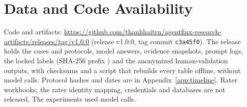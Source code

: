 \documentclass[10pt,letterpaper]{article}
\begin{document}
\section*{Data and Code Availability}
Code and artifacts: \url{https://github.com/thanhhaitrn/agentfinx-research-artifacts/releases/tag/v1.0.0} (release
v1.0.0, tag commit \texttt{c3a45f0}). The release holds the cases and protocols, model answers, evidence snapshots,
prompt logs, the locked labels (SHA-256 prefix \texttt{}) and the anonymized human-validation outputs,
with checksums and a script that rebuilds every table offline, without model calls. Protocol hashes and dates are in
Appendix~\ref{app:timeline}. Rater workbooks, the rater identity mapping, credentials and databases are not released.
The experiments used  model calls.
\end{document}
